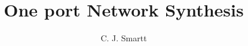 \documentclass{article}
\begin{document}
\title{One port Network Synthesis}
\author{C. J. Smartt}

\maketitle


\clearpage



\clearpage



\clearpage



\clearpage



\clearpage



\clearpage
\end{document}
